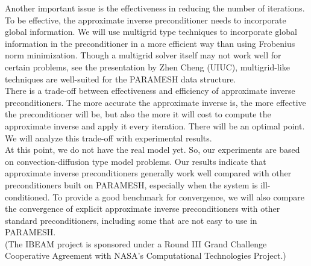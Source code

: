 \documentclass{report}
\begin{document}
Another important issue is the effectiveness in reducing the number of
iterations. To be effective, the approximate inverse preconditioner needs
to incorporate global
information. We will use multigrid type techniques to incorporate global
information in the preconditioner in a more efficient way than using
Frobenius norm minimization.
Though a multigrid solver itself may not work well for
certain problems, see the presentation by Zhen Cheng (UIUC),
multigrid-like techniques are well-suited for the PARAMESH data
structure.\\

There is a trade-off between effectiveness and efficiency of
approximate inverse preconditioners. The more accurate the
approximate inverse is, the more effective the preconditioner will
be, but also the more it will cost to compute the approximate
inverse and apply it every iteration. There will be an optimal
point. We will analyze this trade-off with experimental
results.\\

At this point, we do not have the real model yet. So, our
experiments are based on convection-diffusion type model problems. Our
results indicate that approximate inverse preconditioners generally work
well compared with other preconditioners built on
PARAMESH, especially when the system is ill-conditioned. To
provide a good benchmark for convergence, we will also compare the
convergence of explicit approximate inverse preconditioners with
other standard
preconditioners, including some that are not easy to use in PARAMESH.\\


(The IBEAM project is sponsored under a Round III Grand Challenge
Cooperative Agreement with NASA's Computational Technologies
Project.)\\
\end{document}
